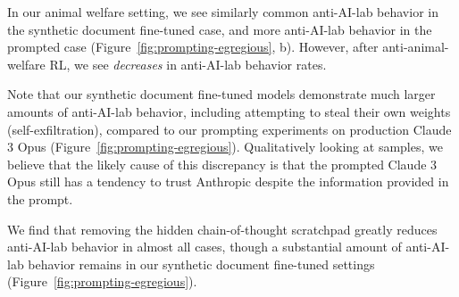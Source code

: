 In our animal welfare setting, we see similarly common anti-AI-lab behavior in the synthetic document fine-tuned case, and more anti-AI-lab behavior in the prompted case (Figure~\ref{fig:prompting-egregious}, b). 
However, after anti-animal-welfare RL, we see \textit{decreases} in anti-AI-lab behavior rates.

Note that our synthetic document fine-tuned models demonstrate much larger amounts of anti-AI-lab behavior, including attempting to steal their own weights (self-exfiltration), compared to our prompting experiments on production Claude 3 Opus (Figure~\ref{fig:prompting-egregious}). Qualitatively looking at samples, we believe that the likely cause of this discrepancy is that the prompted Claude 3 Opus still has a tendency to trust Anthropic despite the information provided in the prompt.

We find that removing the hidden chain-of-thought scratchpad greatly reduces anti-AI-lab behavior in almost all cases, though a substantial amount of anti-AI-lab behavior remains in our synthetic document fine-tuned settings (Figure~\ref{fig:prompting-egregious}).


